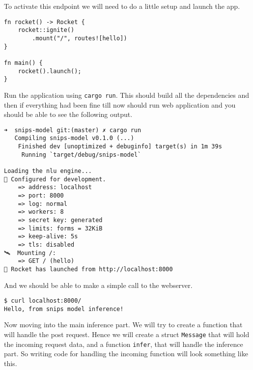 \documentclass{book}
\begin{document}
To activate this endpoint we will need to do a little setup and launch the app.

\begin{lstlisting}[caption={chapter5\\/snips\\-model\\/src\\/main\\.rs}, basicstyle=\small]
fn rocket() -> Rocket {
    rocket::ignite()
        .mount("/", routes![hello])
}

fn main() {
    rocket().launch();
}
\end{lstlisting}

Run the application using \lstinline{cargo run}. This should build all the dependencies and then if everything had been fine till now should run web application and you should be able to see the following output.

\begin{lstlisting}[caption={}, basicstyle=\small]
➜  snips-model git:(master) ✗ cargo run
   Compiling snips-model v0.1.0 (...)
    Finished dev [unoptimized + debuginfo] target(s) in 1m 39s
     Running `target/debug/snips-model`

Loading the nlu engine...
🔧 Configured for development.
    => address: localhost
    => port: 8000
    => log: normal
    => workers: 8
    => secret key: generated
    => limits: forms = 32KiB
    => keep-alive: 5s
    => tls: disabled
🛰  Mounting /:
    => GET / (hello)
🚀 Rocket has launched from http://localhost:8000
\end{lstlisting}
\label{sub:building_an_inference_engine}

And we should be able to make a simple call to the webserver.

\begin{lstlisting}[caption={}, basicstyle=\small]
$ curl localhost:8000/
Hello, from snips model inference!
\end{lstlisting}

Now moving into the main inference part. We will try to create a function that will handle the post request. Hence we will create a struct \lstinline{Message} that will hold the incoming request data, and a function \lstinline{infer}, that will handle the inference part. So writing code for handling the incoming function will look something like this.
\end{document}
